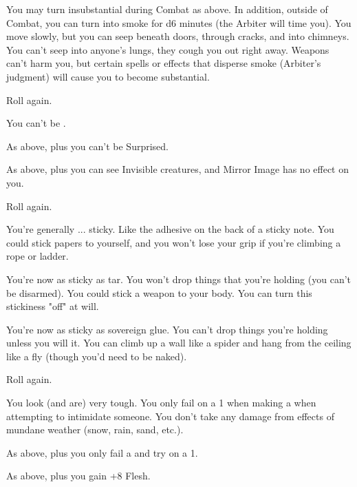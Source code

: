 \begin{multicols*}{2}
 You may turn insubstantial during Combat as above.  In addition, outside of Combat, you can turn into smoke for d6 minutes (the Arbiter will time you).  You move slowly, but you can seep beneath doors, through cracks, and into chimneys. You can't seep into anyone's lungs, they cough you out right away. Weapons can't harm you, but certain spells or effects that disperse smoke (Arbiter's judgment) will cause you to become substantial.

  Roll again.

\NC[Name=Spider Eyes]

  You can't be .

  As above, plus you can't be Surprised.

  As above, plus you can see Invisible creatures, and Mirror Image has no effect on you.

  Roll again.


\NC[Name=Sticky]

 You're generally ... sticky.  Like the adhesive on the back of a sticky note.  You could stick papers to yourself, and you won't lose your grip if you're climbing a rope or ladder.

 You're now as sticky as tar.  You won't drop things that you're holding (you can't be disarmed).  You could stick a weapon to your body.  You can turn this stickiness "off" at will.

 You're now as sticky as sovereign glue.  You can't drop things you're holding unless you will it.  You can climb up a wall like a spider and hang from the ceiling like a fly (though you'd need to be naked).

 Roll again.

\cbreak



\NC[Name=Tough'un]

   You look (and are) very tough.  You only fail on a 1 when making a \RSTRY{\PRE} when attempting to intimidate someone.  You don't take any damage from effects of mundane weather (snow, rain, sand, etc.).

 As above, plus you only fail a \DEATH and \INJURY try on a 1.

 As above, plus you gain +8 Flesh.


\end{multicols*}
